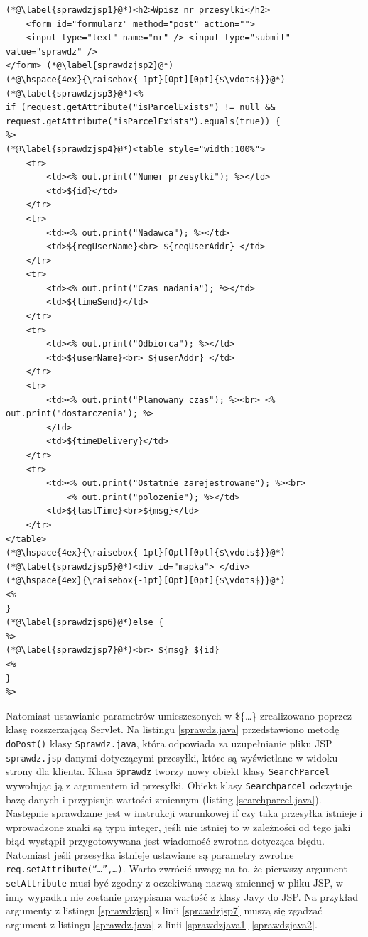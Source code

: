 \documentclass[eng,printmode,oneside]{mgr}
\begin{document}
\begin{lstlisting}[caption=Ciało pliku JavaServlet Pages -
sprawdz.jsp,label=sprawdzjsp] 
(*@\label{sprawdzjsp1}@*)<h2>Wpisz nr przesylki</h2> 
	<form id="formularz" method="post" action=""> 
	<input type="text" name="nr" /> <input type="submit" value="sprawdz" />
</form> (*@\label{sprawdzjsp2}@*)
(*@\hspace{4ex}{\raisebox{-1pt}[0pt][0pt]{$\vdots$}}@*)
(*@\label{sprawdzjsp3}@*)<%
if (request.getAttribute("isParcelExists") != null &&
request.getAttribute("isParcelExists").equals(true)) {
%>
(*@\label{sprawdzjsp4}@*)<table style="width:100%">
	<tr>
		<td><% out.print("Numer przesylki"); %></td>
		<td>${id}</td>
	</tr>
	<tr>
		<td><% out.print("Nadawca"); %></td>
		<td>${regUserName}<br> ${regUserAddr} </td>
	</tr>
	<tr>
		<td><% out.print("Czas nadania"); %></td>
		<td>${timeSend}</td>
	</tr>
	<tr>
		<td><% out.print("Odbiorca"); %></td>
		<td>${userName}<br> ${userAddr} </td>
	</tr>
	<tr>
		<td><% out.print("Planowany czas"); %><br> <% out.print("dostarczenia"); %>
		</td>
		<td>${timeDelivery}</td>
	</tr>
	<tr>
		<td><% out.print("Ostatnie zarejestrowane"); %><br>
			<% out.print("polozenie"); %></td>
		<td>${lastTime}<br>${msg}</td>
	</tr>
</table>
(*@\hspace{4ex}{\raisebox{-1pt}[0pt][0pt]{$\vdots$}}@*)
(*@\label{sprawdzjsp5}@*)<div id="mapka"> </div>
(*@\hspace{4ex}{\raisebox{-1pt}[0pt][0pt]{$\vdots$}}@*)
<%
}
(*@\label{sprawdzjsp6}@*)else {
%>
(*@\label{sprawdzjsp7}@*)<br> ${msg} ${id}
<% 
}
%>
\end{lstlisting}

Natomiast ustawianie parametrów umieszczonych w \$\{\ldots\} zrealizowano
poprzez klasę rozszerzającą Servlet. Na listingu \ref{sprawdz.java} przedstawiono metodę
\texttt{doPost()} klasy \texttt{Sprawdz.java}, która odpowiada za uzupełnianie
pliku JSP \texttt{sprawdz.jsp} danymi dotyczącymi przesyłki, które są
wyświetlane w widoku strony dla klienta. Klasa \texttt{Sprawdz} tworzy nowy
obiekt klasy \texttt{SearchParcel} wywołując ją z argumentem id przesyłki.
Obiekt klasy \texttt{Searchparcel} odczytuje bazę danych i przypisuje
wartości zmiennym (listing \ref{searchparcel.java}). Następnie sprawdzane jest
w instrukcji warunkowej if czy taka przesyłka istnieje i wprowadzone znaki są
typu integer, jeśli nie istniej to w zależności od tego jaki błąd wystąpił
przygotowywana jest wiadomość zwrotna dotycząca błędu. Natomiast jeśli przesyłka
istnieje ustawiane są parametry zwrotne
\texttt{req.setAttribute(``\ldots'',\ldots)}. Warto zwrócić uwagę na to, że
pierwszy argument \texttt{setAttribute} musi być zgodny z oczekiwaną nazwą
zmiennej w pliku JSP, w inny wypadku nie zostanie przypisana wartość z klasy
Javy do JSP. Na przykład argumenty z listingu \ref{sprawdzjsp} z linii
\ref{sprawdzjsp7} muszą się zgadzać argument z listingu \ref{sprawdz.java} z
linii \ref{sprawdzjava1}-\ref{sprawdzjava2}.
\end{document}
